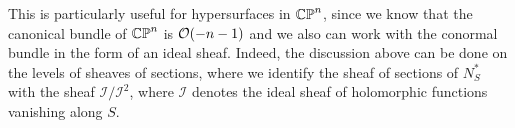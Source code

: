 %
This is particularly useful for hypersurfaces in $\mathbb{CP}^n$, since we know that
the canonical bundle of $\mathbb{CP}^n$ is $\mathcal{O}(-n-1)$ and we also can work with the
conormal bundle in the form of an ideal sheaf. Indeed, the discussion above
can be done on the levels of sheaves of sections, where we identify
the sheaf of sections of $N^*_S$ with the sheaf $\mathcal{I}/\mathcal{I}^2$,
where $\mathcal{I}$ denotes the ideal sheaf of holomorphic functions vanishing along $S$.
%